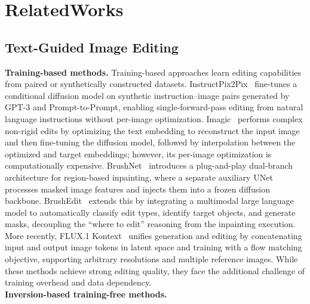 \section{RelatedWorks}
\label{section:3_relatedWorks}
\subsection{Text-Guided Image Editing}
\noindent\textbf{Training-based methods.}
Training-based approaches learn editing capabilities from paired or synthetically constructed datasets. InstructPix2Pix~\cite{InstructPix2Pix} fine-tunes a conditional diffusion model on synthetic instruction--image pairs generated by GPT-3 and Prompt-to-Prompt, enabling single-forward-pass editing from natural language instructions without per-image optimization. Imagic~\cite{Imagic} performs complex non-rigid edits by optimizing the text embedding to reconstruct the input image and then fine-tuning the diffusion model, followed by interpolation between the optimized and target embeddings; however, its per-image optimization is computationally expensive. BrushNet~\cite{BrushNet} introduces a plug-and-play dual-branch architecture for region-based inpainting, where a separate auxiliary UNet processes masked image features and injects them into a frozen diffusion backbone. BrushEdit~\cite{BrushEdit} extends this by integrating a multimodal large language model to automatically classify edit types, identify target objects, and generate masks, decoupling the ``where to edit'' reasoning from the inpainting execution. More recently, FLUX.1 Kontext~\cite{FLUX.1Kontext} unifies generation and editing by concatenating input and output image tokens in latent space and training with a flow matching objective, supporting arbitrary resolutions and multiple reference images. While these methods achieve strong editing quality, they face the additional challenge of training overhead and data dependency.
\\
\noindent\textbf{Inversion-based training-free methods.}
